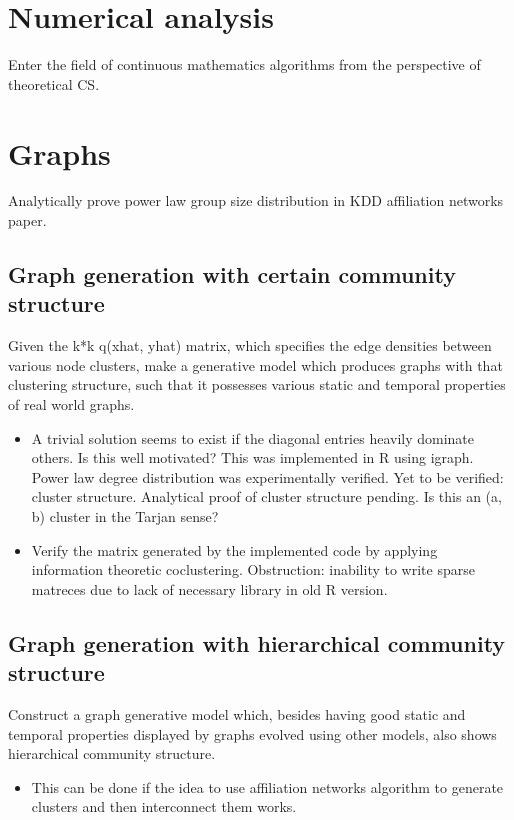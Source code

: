 \documentclass{article}
\begin{document}
\section{Numerical analysis}
Enter the field of continuous mathematics algorithms from the perspective of theoretical CS.

\section{Graphs}
Analytically prove power law group size distribution in KDD affiliation networks paper.

\subsection{Graph generation with certain community structure}
Given the k*k q(xhat, yhat) matrix, which specifies the edge densities between various node clusters, make a generative model which produces graphs with that clustering structure, such that it possesses various static and temporal properties of real world graphs.

\begin{itemize}
\item A trivial solution seems to exist if the diagonal entries heavily dominate others. Is this well motivated?
\subitem This was implemented in R using igraph. Power law degree distribution was experimentally verified. Yet to be verified: cluster structure.
\subitem Analytical proof of cluster structure pending. Is this an (a, b) cluster in the Tarjan sense?
\item Verify the matrix generated by the implemented code by applying information theoretic coclustering. Obstruction: inability to write sparse matreces due to lack of necessary library in old R version.
\end{itemize}

\subsection{Graph generation with hierarchical community structure}
Construct a graph generative model which, besides having good static and temporal properties displayed by graphs evolved using other models, also shows hierarchical community structure.

\begin{itemize}
\item This can be done if the idea to use affiliation networks algorithm to generate clusters and then interconnect them works.
\end{itemize}
\end{document}
